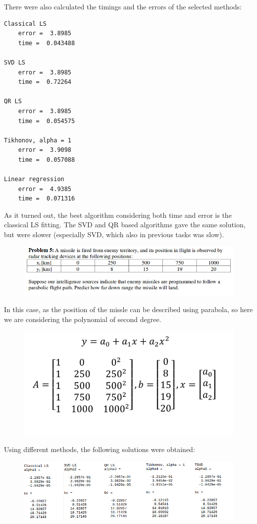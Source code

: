 \documentclass[eng,openany]{mgr}
\begin{document}
There were also calculated the timings and the errors of the selected methods:
\begin{lstlisting}
Classical LS
	error =  3.8985
	time =  0.043488
	
SVD LS
	error =  3.8985
	time =  0.72264
	
QR LS
	error =  3.8985
	time =  0.054575
	
Tikhonov, alpha = 1
	error =  3.9098
	time =  0.057088
	
Linear regression
	error =  4.9385
	time =  0.071316
\end{lstlisting}
As it turned out, the best algorithm considering both time and error is the classical LS fitting. The SVD and QR based algorithms gave the same solution, but were slower (especially SVD, which also in previous tasks was slow).
\newpage

\begin{figure}[h]
\centering
\includegraphics[width=0.7\linewidth]{screenshot012}
\label{fig:screenshot012}
\end{figure}
In this case, as the position of the missle can be described using parabola, so here we are considering the polynomial of second degree.
\begin{figure}[h]
\centering
\includegraphics[width=0.4\linewidth]{screenshot014}
\label{fig:screenshot014}
\end{figure}

Using different methods, the following solutions were obtained:
\begin{figure}[h]
\centering
\includegraphics[width=0.7\linewidth]{screenshot013}
\label{fig:screenshot013}
\end{figure}
\end{document}
